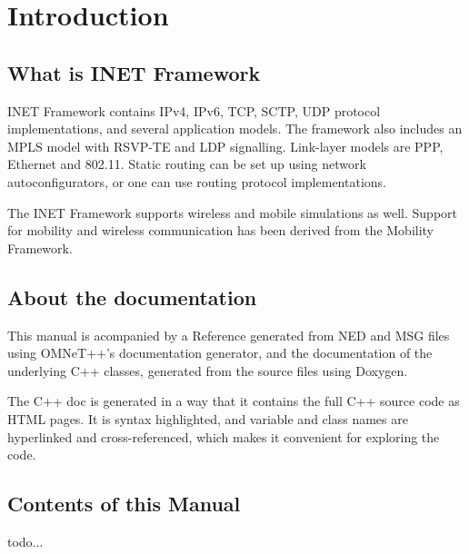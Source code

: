 \chapter{Introduction}
\label{cha:introduction}


\section{What is INET Framework}

INET Framework contains IPv4, IPv6, TCP, SCTP, UDP protocol implementations,
and several application models. The framework also includes an MPLS model
with RSVP-TE and LDP signalling. Link-layer models are PPP, Ethernet and 802.11.
Static routing can be set up using network autoconfigurators, or one can use
routing protocol implementations.

The INET Framework supports wireless and mobile simulations as well. Support
for mobility and wireless communication has been derived from the
Mobility Framework.


\section{About the documentation}

This manual is acompanied by a Reference generated from NED and MSG files using
OMNeT++'s documentation generator, and the documentation of the underlying C++ classes,
generated from the source files using Doxygen.

The C++ doc is generated in a way that it contains the full C++ source code
as HTML pages. It is syntax highlighted, and variable and class names are hyperlinked
and cross-referenced, which makes it convenient for exploring the code.


\section{Contents of this Manual}

todo...



